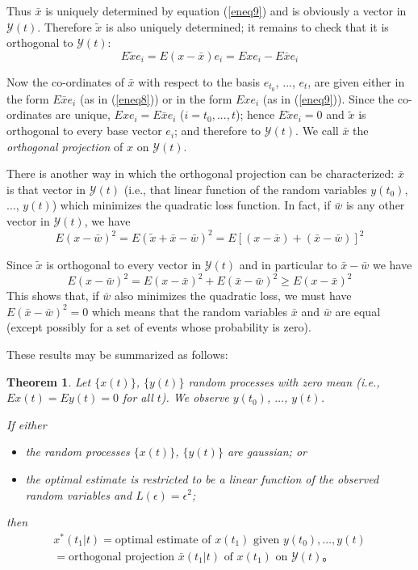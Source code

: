 \documentclass{article}
\newtheorem{theorem}{Theorem}
\newcommand{\manf}[1]{\mathbf{\mathcal{#1}}}
\begin{document}
Thus $\bar{x}$ is uniquely determined by equation (\ref{eneq9}) and is obviously a vector in $\manf{Y}(t)$. Therefore $\tilde{x}$ is also uniquely determined; it remains to check that it is orthogonal to $\manf{Y}(t)$:
\begin{equation*}
E\tilde{x}e_i=E(x-\bar{x})e_i=Exe_i-E\bar{x}e_i
\end{equation*}

Now the co-ordinates of $\bar{x}$ with respect to the basis $e_{t_0}$, $\dotsc$, $e_t$, are given either in the form $E\bar{x}e_i$ (as in (\ref{eneq8})) or in the form $Exe_i$ (as in (\ref{eneq9})). Since the co-ordinates are unique, $Exe_i = E\bar{x}e_i$ ($i = t_0, ..., t$); hence $E\tilde{x}e_i = 0$ and $\tilde{x}$ is orthogonal to every base vector $e_i$; and therefore to $\manf{Y}(t)$. We call $\bar{x}$ the \emph{orthogonal projection} of $x$ on $\manf{Y}(t)$.

There is another way in which the orthogonal projection can be characterized: $\bar{x}$ is that vector in $\manf{Y}(t)$ (i.e., that linear function of the random variables $y(t_0)$, $\dotsc$, $y(t)$) which minimizes the quadratic loss function. In fact, if $\bar{w}$ is any other vector in $\manf{Y}(t)$, we have
\begin{equation*}
E(x-\bar{w})^2=E(\tilde{x}+\bar{x}-\bar{w})^2=E[(x-\bar{x})+(\bar{x}-\bar{w})]^2
\end{equation*}

Since $\tilde{x}$ is orthogonal to every vector in $\manf{Y}(t)$ and in particular to $\bar{x} - \bar{w}$ we have
\begin{equation}
\label{eneq10}
E(x-\bar{w})^2=E(x-\bar{x})^2+E(\bar{x}-\bar{w})^2 \ge E(x-\bar{x})^2
\end{equation}
This shows that, if $\bar{w}$ also minimizes the quadratic loss, we must have $E(\bar{x} - \bar{w})^2 = 0$ which means that the random variables $\bar{x}$ and $\bar{w}$ are equal (except possibly for a set of events whose probability is zero).

These results may be summarized as follows:
\begin{theorem}
\label{th2}
Let $\{x(t)\}$, $\{y(t)\}$ random processes with zero mean (i.e., $Ex(t) = Ey(t) = 0$ for all $t$). We observe $y(t_0)$, $\dotsc$, $y(t)$.

If either
\begin{itemize}
\item[A] the random processes $\{x(t)\}$, $\{y(t)\}$ are gaussian; or
\item[B] the optimal estimate is restricted to be a linear function of the observed random variables and $L(\epsilon) = \epsilon^2$;
\end{itemize}
then
\begin{multline}
\label{eneq11}
x^\ast (t_1 \vert t) = \text{optimal estimate of }x(t_1)\text{ given }y(t_0),\dotsc,y(t)\\
=\text{orthogonal projection }\bar{x}(t_1 \vert t)\text{ of }x(t_1)\text{ on }\mathbf{\mathcal{Y}}(t)。
\end{multline}
\end{theorem}
\end{document}
